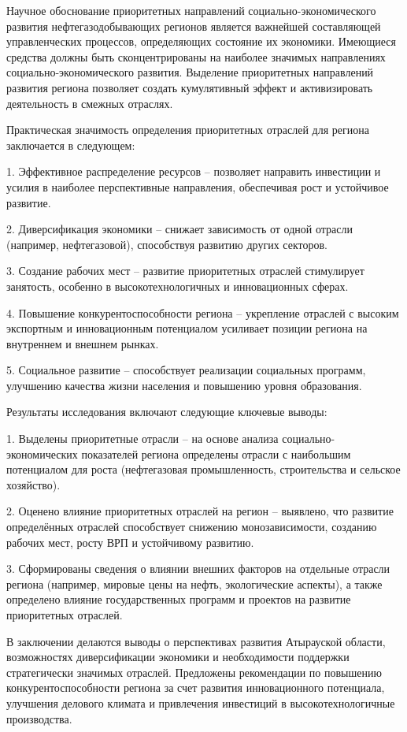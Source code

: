 Научное обоснование приоритетных направлений социально-экономического
развития нефтегазодобывающих регионов является важнейшей составляющей
управленческих процессов, определяющих состояние их экономики. Имеющиеся
средства должны быть сконцентрированы на наиболее значимых направлениях
социально-экономического развития. Выделение приоритетных направлений
развития региона позволяет создать кумулятивный эффект и активизировать
деятельность в смежных отраслях.

Практическая значимость определения приоритетных отраслей для региона
заключается в следующем:

1. Эффективное распределение ресурсов -- позволяет направить инвестиции
и усилия в наиболее перспективные направления, обеспечивая рост и
устойчивое развитие.

2. Диверсификация экономики -- снижает зависимость от одной отрасли
(например, нефтегазовой), способствуя развитию других секторов.

3. Создание рабочих мест -- развитие приоритетных отраслей стимулирует
занятость, особенно в высокотехнологичных и инновационных сферах.

4. Повышение конкурентоспособности региона -- укрепление отраслей с
высоким экспортным и инновационным потенциалом усиливает позиции региона
на внутреннем и внешнем рынках.

5. Социальное развитие -- способствует реализации социальных программ,
улучшению качества жизни населения и повышению уровня образования.

Результаты исследования включают следующие ключевые выводы:

1. Выделены приоритетные отрасли -- на основе анализа
социально-экономических показателей региона определены отрасли с
наибольшим потенциалом для роста (нефтегазовая промышленность,
строительства и сельское хозяйство).

2. Оценено влияние приоритетных отраслей на регион -- выявлено, что
развитие определённых отраслей способствует снижению монозависимости,
созданию рабочих мест, росту ВРП и устойчивому развитию.

3. Сформированы сведения о влиянии внешних факторов на отдельные отрасли
региона (например, мировые цены на нефть, экологические аспекты), а
также определено влияние государственных программ и проектов на развитие
приоритетных отраслей.

В заключении делаются выводы о перспективах развития Атырауской области,
возможностях диверсификации экономики и необходимости поддержки
стратегически значимых отраслей. Предложены рекомендации по повышению
конкурентоспособности региона за счет развития инновационного
потенциала, улучшения делового климата и привлечения инвестиций в
высокотехнологичные производства.

